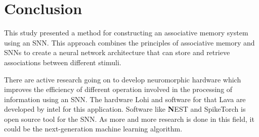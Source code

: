 \chapter{Conclusion}%

This study presented a method for constructing an associative memory system
using an SNN. This approach combines the principles of associative memory and
SNNs to create a neural network architecture that can store and retrieve
associations between different stimuli.

There are active research going on to develop neuromorphic hardware which
improves the efficiency of different operation involved in the processing of
information using an SNN. The hardware Lohi and software for that Lava are
developed by intel for this application. Software like \textbf NEST and
SpikeTorch is open source tool for the SNN. As more and more research is done
in this field, it could be the next-generation machine learning algorithm.